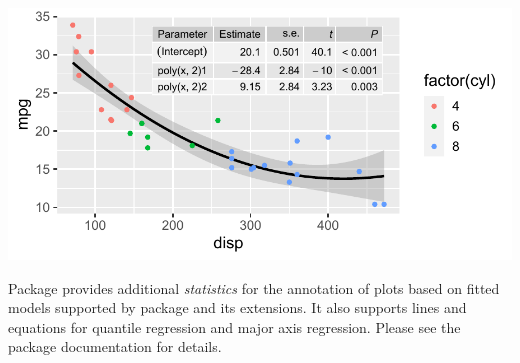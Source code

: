 \documentclass[krantz2]{krantz}\usepackage{knitr}
\begin{document}
\begin{knitrout}\footnotesize
{}\color{fgcolor}\begin{kframe}
\begin{alltt}
\hlstd{(} 
        \hlstd{=} \hlstd{(}     \hlstd{=}  \hlopt{+}
  \hlstd{(}   \hlstd{=} \hlstd{)} \hlopt{+}
  \hlstd{(} \hlstd{=} \hlstd{(} 
               \hlstd{=} \hlstd{,}
               \hlstd{=} \hlstd{(} \hlstd{=} \hlstd{,}
                           \hlstd{=} \hlstd{,}
                           \hlstd{=} \hlstd{,}
                           \hlstd{=} \hlstd{,}
                           \hlstd{=} \hlstd{),}
               \hlstd{=} \hlstd{,}  \hlstd{=} \hlstd{)} \hlopt{+}
  \hlstd{()} \hlopt{+}
  \hlstd{(} \hlstd{=} \hlstd{)}
\end{alltt}
\end{kframe}

{\centering \includegraphics[width=.7\textwidth]{figure/pos-smooth-plot-13-1} 

}


\end{knitrout}

Package  provides additional \emph{statistics} for the annotation of plots based on fitted models supported by package  and its extensions. It also supports lines and equations for quantile regression and major axis regression. Please see the package documentation for details.
\end{document}
